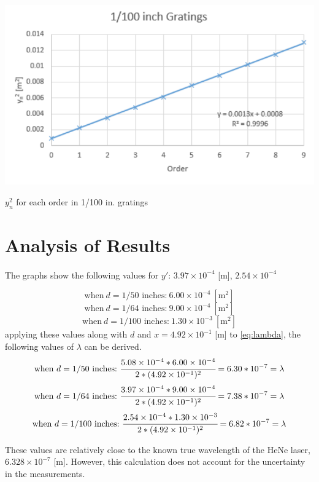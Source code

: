 \documentclass{article}
\begin{document}
\begin{graph}
  \includegraphics[width=\textwidth]{img/100.pdf}
  \caption{$y_{n}^{2}$ for each order in 1/100 in. gratings}
  \label{g:100}
\end{graph}

\section{Analysis of Results}
\paragraph{}

The graphs show the following values for $y'$:
$3.97 \times 10^{-4}$ [m], $2.54 \times 10^{-4}$

$$
\text{when}~d=\text{1/50 inches:}~6.00 \times 10^{-4}~[\text{m}^2]
$$
$$
\text{when}~d=\text{1/64 inches:}~9.00 \times 10^{-4}~[\text{m}^2]
$$
$$
\text{when}~d=\text{1/100 inches:}~1.30 \times 10^{-3}~[\text{m}^2]
$$
applying these values along with $d$ and $x = 4.92 \times 10^{-1}$ [m] to \eqref{eq:lambda}, the following values of $\lambda$ can be derived.
$$
\text{when}~d=\text{1/50 inches:}~\cfrac{5.08 \times 10^{-4} * 6.00 \times 10^{-4}}{2*(4.92 \times 10^{-1})^2} = 6.30 * 10^{-7} = \lambda
$$
$$
\text{when}~d=\text{1/64 inches:}~\cfrac{3.97 \times 10^{-4} * 9.00 \times 10^{-4}}{2*(4.92 \times 10^{-1})^2} = 7.38 * 10^{-7} = \lambda
$$
$$
\text{when}~d=\text{1/100 inches:}~\cfrac{2.54 \times 10^{-4} * 1.30 \times 10^{-3}}{2*(4.92 \times 10^{-1})^2} = 6.82 * 10^{-7} = \lambda
$$

These values are relatively close to the known true wavelength of the HeNe laser, $6.328 \times 10^{-7}$ [m]. However, this calculation does not account for the uncertainty in the measurements.
\end{document}
